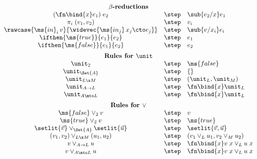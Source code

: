 \begin{figure}
  \begin{displaymath}
    \begin{array}{ccl}
      \multicolumn{3}{c}{\textbf{$\beta$-reductions}}\\
      (\fn\bind{x}e_1) \; e_2 &\step& \sub{e_2/x} e_1\\
      \pi_i \; (v_1, v_2) &\step& v_i\\
      \rawcase{\ms{in}_i\,v}{\widevec{\ms{in_j}\,x_j \cto e_j}}
      &\step& \sub{v/x_i} e_i\\
      \ifthen{\ms{true}}{e_1}{e_2} &\step& e_1\\
      \ifthen{\ms{false}}{e_1}{e_2} &\step& e_2

      \vspace{0.5em}\\
      \multicolumn{3}{c}{\textbf{Rules for }\unit}\\
      \unit_2 &\step& \ms{false}\\
      \unit_{\Set{A}} &\step& \{\}\\
      \unit_{L \x M} &\step& (\unit_L, \unit_M)\\
      \unit_{A \to L} &\step& \fn\bind{x} \unit_L\\
      \unit_{A \mto L} &\step& \fn\bind{x} \unit_L

      \vspace{0.5em}\\
      \multicolumn{3}{c}{\textbf{Rules for }\vee}\\
      \ms{false} \vee_2 v &\step& v\\
      \ms{true} \vee_2 v &\step& \ms{true}\\
      \setlit{\vec{v}} \vee_{\Set{A}} \setlit{\vec{u}} &\step& \setlit{\vec{v}, \vec{u}}\\
      (v_1, v_2) \vee_{L \x M} (u_1, u_2) &\step& (v_1 \vee_L u_1, v_2 \vee_M u_2)\\
      v \vee_{A \to L} u &\step& \fn\bind{x} v\;x \vee_L u\;x\\
      v \vee_{A \mto L} u &\step& \fn\bind{x} v\;x \vee_L u\;x


\end{array}
\end{displaymath}
\end{figure}
